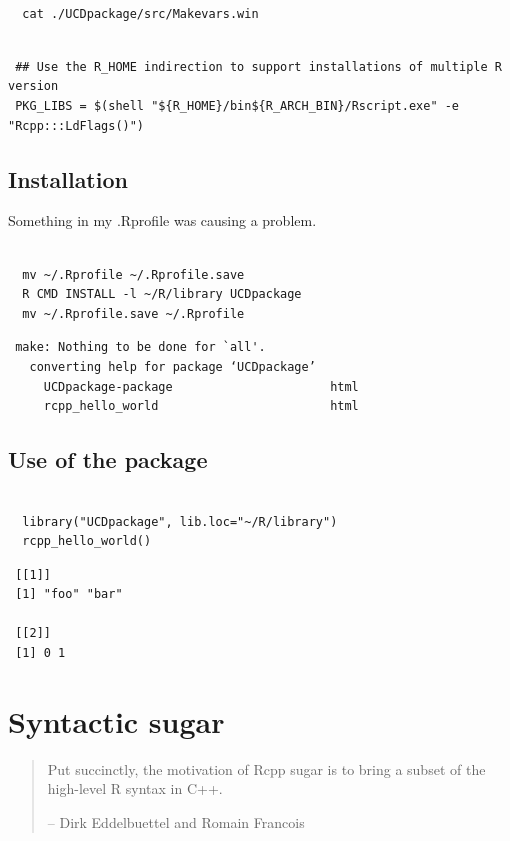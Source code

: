 \documentclass[11pt]{article}
\begin{document}
\begin{verbatim}
  
  cat ./UCDpackage/src/Makevars.win
\end{verbatim}

\begin{verbatim}
 
 ## Use the R_HOME indirection to support installations of multiple R version
 PKG_LIBS = $(shell "${R_HOME}/bin${R_ARCH_BIN}/Rscript.exe" -e "Rcpp:::LdFlags()")
\end{verbatim}
\subsection{Installation}
\label{sec-8-10}


Something in my .Rprofile was causing a problem.


\begin{verbatim}
  
  mv ~/.Rprofile ~/.Rprofile.save
  R CMD INSTALL -l ~/R/library UCDpackage
  mv ~/.Rprofile.save ~/.Rprofile
\end{verbatim}

\begin{verbatim}
 make: Nothing to be done for `all'.
   converting help for package ‘UCDpackage’
     UCDpackage-package                      html  
     rcpp_hello_world                        html  
\end{verbatim}
\subsection{Use of the package}
\label{sec-8-11}




\begin{verbatim}
  
  library("UCDpackage", lib.loc="~/R/library")
  rcpp_hello_world()
\end{verbatim}

\begin{verbatim}
 [[1]]
 [1] "foo" "bar"
 
 [[2]]
 [1] 0 1
\end{verbatim}
\section{Syntactic sugar}
\label{sec-9}


\begin{quote}

Put succinctly, the motivation of Rcpp sugar is to bring a subset of
the high-level R syntax in C++.

-- Dirk Eddelbuettel and Romain Francois

\end{quote}
\end{document}
